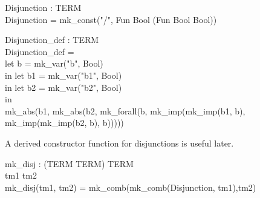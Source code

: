 \documentclass[a4paper,11pt,titlepage]{article}
\begin{document}
\begin{titlepage}
\begin{HOLConst}
\+	\PrNL{}Disjunction\PrNN{} : TERM\\
\PrPH{}
\+	Disjunction = mk\_const("\Backslash{}\Backslash{}/", Fun Bool (Fun Bool Bool))\\
\end{HOLConst}
\begin{HOLConst}
\+	\PrNL{}Disjunction\_def\PrNN{} : TERM\\
\PrPH{}
\+	Disjunction\_def =\\
\+	let b = mk\_var("b", Bool)\\
\+	in let b1 = mk\_var("b1", Bool)\\
\+	in let b2 = mk\_var("b2", Bool)\\
\+	in\\
\+	mk\_abs(b1, mk\_abs(b2, mk\_forall(b, mk\_imp(mk\_imp(b1, b),\\
\+				mk\_imp(mk\_imp(b2, b), b)))))\\
\end{HOLConst}
A derived constructor function for disjunctions is
useful later.
\begin{HOLConst}
\+	\PrNL{}mk\_disj\PrNN{} : (TERM \MMM{\times} TERM) \MMM{\rightarrow} TERM\\
\PrPH{}
\+	\MMM{\forall} tm1 tm2\MMM{\bullet}\\
\+	mk\_disj(tm1, tm2) = mk\_comb(mk\_comb(Disjunction, tm1),tm2)\\
\end{HOLConst}


\end{titlepage}
\end{document}
